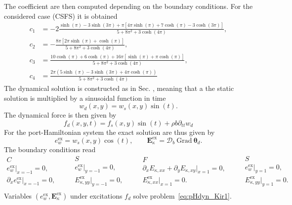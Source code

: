 The coefficient are then computed depending on the boundary conditions. For the considered case (CSFS) it is obtained
\begin{align*}
c_1 &= -2 \frac{\sinh(\pi) - 3 \sinh(3\pi) + \pi[4\pi\sinh(\pi)+7\cosh(\pi) - 3\cosh(3 \pi)]}{5 + 8\pi^2 + 3\cosh(4\pi)}, \\
c_2 &= - \frac{8\pi[2\pi\sinh(\pi) + \cosh(\pi)]}{5 + 8\pi^2 + 3\cosh(4\pi)}, \\
c_3 &= \frac{10\cosh(\pi) + 6\cosh(\pi) + 16\pi[\sinh(\pi) + \pi\cosh(\pi)]}{5 + 8 \pi^2 + 3\cosh(4\pi)}, \\
c_4 &= \frac{2\pi(5\sinh(\pi) - 3\sinh(3\pi) + 4\pi\cosh(\pi))}{5 + 8\pi^2 + 3\cosh(4\pi)}
\end{align*}
The dynamical solution is constructed as in Sec. , meaning that a the static solution is multiplied by a sinusoidal function in time
\begin{equation*}
w_d(x, y) = w_s(x, y) \sin(t).
\end{equation*}
The dynamical force is then given by
\begin{equation*}
f_d(x,y,t) = f_s(x,y)\sin(t) +  \rho b \partial_{tt} w_d
\end{equation*}
For the port-Hamiltonian system the exact solution  are thus given by
\begin{equation}
e_w^\text{ex} = w_s(x,y) \cos(t), \qquad \bm{E}_\kappa^\text{ex} =  \bm{\mathcal{D}}_b \ \mathrm{Grad} \ \bm{\theta}_d.
\end{equation}
The boundary conditions read
\begin{equation}
\begin{aligned}
C \\
e_w^\text{ex}\vert_{x=-1} = 0, \\
\partial_{x} e_w^\text{ex}\vert_{x=-1} = 0, \\
\end{aligned} \qquad
\begin{aligned}
S \\
e_w^\text{ex}\vert_{y=-1} = 0, \\
{E}_{\kappa, yy}^\text{ex}\vert_{y=-1} =  0, \\
\end{aligned} \qquad
\begin{aligned}
F \\
\partial_x {E}_{\kappa, xx} + \partial_y {E}_{\kappa, xy}\vert_{x=1} = 0, \\
{E}_{\kappa, xx}^\text{ex}\vert_{x=1} =  0. \\
\end{aligned} \qquad
\begin{aligned}
S \\
e_w^\text{ex}\vert_{y=1} = 0, \\
{E}_{\kappa, yy}^\text{ex}\vert_{y=1} =  0. \\
\end{aligned} 
\end{equation}
Variables $(e_w^\text{ex}, \bm{E}_\kappa^\text{ex})$ under excitations $f_d$ solve problem~\eqref{eq:pHdyn_Kir1}. 

